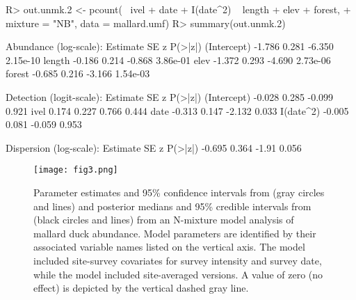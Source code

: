 \documentclass[codesnippet]{jss}
\begin{document}
\begin{CodeInput}
R> out.unmk.2 <- pcount(~ ivel + date + I(date^2) ~ length + elev + forest,
+    mixture = "NB", data = mallard.umf)
R> summary(out.unmk.2)
\end{CodeInput}
\begin{CodeOutput}
Abundance (log-scale):
             Estimate         SE           z     P(>|z|)
(Intercept)    -1.786      0.281      -6.350    2.15e-10
length         -0.186      0.214      -0.868    3.86e-01
elev           -1.372      0.293      -4.690    2.73e-06
forest         -0.685      0.216      -3.166    1.54e-03

Detection (logit-scale):
             Estimate         SE           z     P(>|z|)
(Intercept)    -0.028      0.285      -0.099       0.921
ivel            0.174      0.227       0.766       0.444
date           -0.313      0.147      -2.132       0.033
I(date^2)      -0.005      0.081      -0.059       0.953

Dispersion (log-scale):
Estimate          SE       z    P(>|z|)
-0.695         0.364   -1.91      0.056
\end{CodeOutput}

\begin{figure}[p]
  \texttt{[image: fig3.png]}
  \caption{Parameter estimates and 95\% confidence intervals from  (gray circles and lines) and posterior medians and 95\% credible intervals from  (black circles and lines) from an N-mixture model analysis of mallard duck abundance. Model parameters are identified by their associated variable names listed on the vertical axis.  The  model included site-survey covariates for survey intensity and survey date, while the  model included site-averaged versions. A value of zero (no effect) is depicted by the vertical dashed gray line.}
  \label{fig:fig3}
\end{figure}
\end{document}

